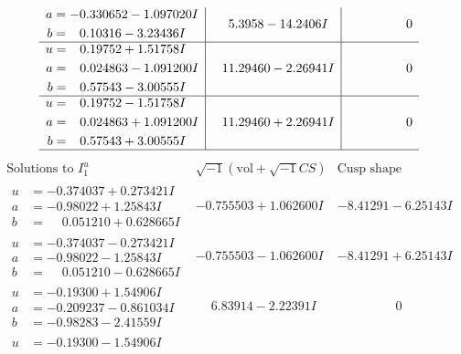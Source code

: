 \documentclass[1p]{elsarticle_modified}
\theoremstyle{definition}
\newcommand{\I}{\sqrt{-1}}
\begin{document}
$$\begin{array}{c|c|c}
\begin{aligned}
a &= -0.330652 - 1.097020 I \\
b &= \phantom{-}0.10316 - 3.23436 I\end{aligned}
 & \phantom{-}5.3958 - 14.2406 I & \phantom{-0.000000 } 0 \\ \hline\begin{aligned}
u &= \phantom{-}0.19752 + 1.51758 I \\
a &= \phantom{-}0.024863 - 1.091200 I \\
b &= \phantom{-}0.57543 - 3.00555 I\end{aligned}
 & \phantom{-}11.29460 - 2.26941 I & \phantom{-0.000000 } 0 \\ \hline\begin{aligned}
u &= \phantom{-}0.19752 - 1.51758 I \\
a &= \phantom{-}0.024863 + 1.091200 I \\
b &= \phantom{-}0.57543 + 3.00555 I\end{aligned}
 & \phantom{-}11.29460 + 2.26941 I & \phantom{-0.000000 } 0\\
 \hline 
 \end{array}$$\newpage$$\begin{array}{c|c|c}  
\text{Solutions to }I^u_{1}& \I (\text{vol} + \sqrt{-1}CS) & \text{Cusp shape}\\
 \hline 
\begin{aligned}
u &= -0.374037 + 0.273421 I \\
a &= -0.98022 + 1.25843 I \\
b &= \phantom{-}0.051210 + 0.628665 I\end{aligned}
 & -0.755503 + 1.062600 I & -8.41291 - 6.25143 I \\ \hline\begin{aligned}
u &= -0.374037 - 0.273421 I \\
a &= -0.98022 - 1.25843 I \\
b &= \phantom{-}0.051210 - 0.628665 I\end{aligned}
 & -0.755503 - 1.062600 I & -8.41291 + 6.25143 I \\ \hline\begin{aligned}
u &= -0.19300 + 1.54906 I \\
a &= -0.209237 - 0.861034 I \\
b &= -0.98283 - 2.41559 I\end{aligned}
 & \phantom{-}6.83914 - 2.22391 I & \phantom{-0.000000 } 0 \\ \hline\begin{aligned}
u &= -0.19300 - 1.54906 I \\

\end{aligned}
\end{array}$$
\end{document}
